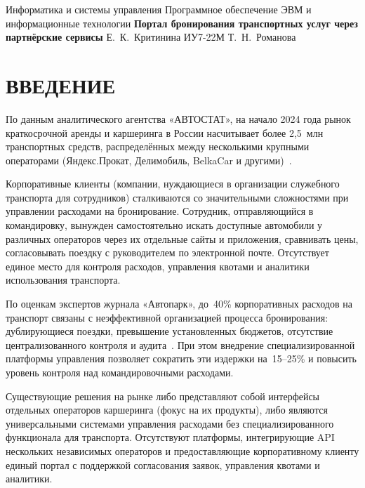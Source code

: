 \documentclass{bmstu}
\begin{document}
\maketechnicalreport
    {Информатика и системы управления}                          %
    {Программное обеспечение ЭВМ и информационные технологии}   %
    {\textbf{Портал бронирования транспортных услуг через партнёрские сервисы}}                %
    {}                                            %
    {Е.~К.~Критинина}                                 %
    {ИУ7-22М}                                     %
    {Т.~Н.~Романова}                              %
    {}                                            %


\newpage
\chapter*{ВВЕДЕНИЕ}

По данным аналитического агентства «АВТОСТАТ», на начало 2024 года рынок краткосрочной аренды и каршеринга в России насчитывает более 2,5~млн транспортных средств, распределённых между несколькими крупными операторами (Яндекс.Прокат, Делимобиль, BelkaCar и другими)~\cite{autostat2024}.

Корпоративные клиенты (компании, нуждающиеся в организации служебного транспорта для сотрудников) сталкиваются со значительными сложностями при управлении расходами на бронирование. Сотрудник, отправляющийся в командировку, вынужден самостоятельно искать доступные автомобили у различных операторов через их отдельные сайты и приложения, сравнивать цены, согласовывать поездку с руководителем по электронной почте. Отсутствует единое место для контроля расходов, управления квотами и аналитики использования транспорта.

По оценкам экспертов журнала «Автопарк», до~40\% корпоративных расходов на транспорт связаны с неэффективной организацией процесса бронирования: дублирующиеся поездки, превышение установленных бюджетов, отсутствие централизованного контроля и аудита~\cite{autopark2023}. При этом внедрение специализированной платформы управления позволяет сократить эти издержки на~15--25\% и повысить уровень контроля над командировочными расходами.

Существующие решения на рынке либо представляют собой интерфейсы отдельных операторов каршеринга (фокус на их продукты), либо являются универсальными системами управления расходами без специализированного функционала для транспорта. Отсутствуют платформы, интегрирующие API нескольких независимых операторов и предоставляющие корпоративному клиенту единый портал с поддержкой согласования заявок, управления квотами и аналитики.
\end{document}
